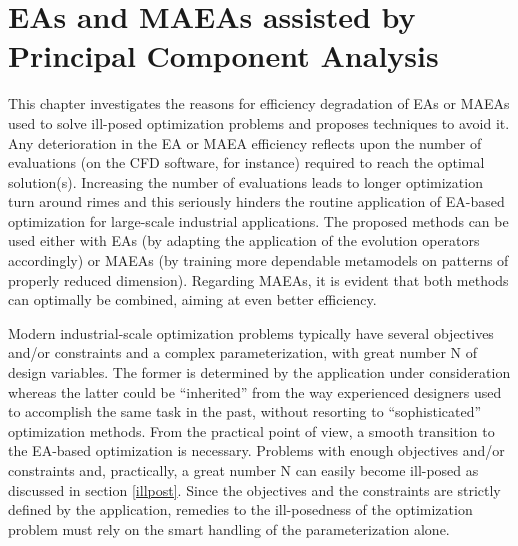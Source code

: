 \ifpdf
    \graphicspath{{4/figures/PNG/}{4/figures/PDF/}{3/figures/}}
\else
    \graphicspath{{4/figures/EPS/}{4/figures/}}
\fi

\chapter{EAs and MAEAs assisted by Principal Component Analysis} %
\label{VarCorrChapter}

This chapter investigates the reasons for efficiency degradation of EAs or MAEAs used to solve ill-posed optimization problems \cite{Salomon,Roy_2002a,Ghisu_2010} and proposes techniques to avoid it. Any deterioration in the EA or MAEA efficiency reflects upon the number of evaluations (on the CFD software, for instance) required to reach the optimal solution(s). Increasing the number of evaluations leads to longer optimization turn around rimes and this seriously hinders the routine application of EA-based optimization for large-scale industrial applications. The proposed methods can be used either with EAs (by adapting the application of the evolution operators accordingly) or MAEAs (by training more dependable metamodels on patterns of properly reduced dimension). Regarding MAEAs, it is evident that both methods can optimally be combined, aiming at even better efficiency. 

Modern industrial-scale optimization problems typically have several objectives and/or constraints  and a complex parameterization, with great number N of design variables. The former is determined by the application under consideration whereas the latter could be ``inherited'' from the way experienced designers used to accomplish the same task in the past, without resorting to ``sophisticated'' optimization methods. From the practical point of view, a smooth transition to the EA-based optimization is necessary. Problems with enough objectives and/or constraints and, practically, a great number N can easily become ill-posed as discussed in section \ref{illpost}. Since the objectives and the constraints are strictly defined by the application, remedies to the ill-posedness of the optimization problem must rely on the smart handling of the parameterization alone. 

